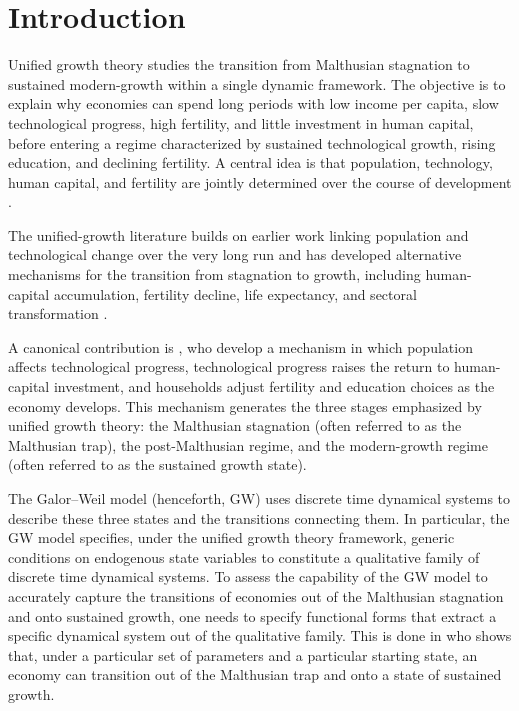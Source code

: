 \documentclass[a4paper,fleqn]{cas-sc}
\begin{document}
\maketitle

\section{Introduction}\label{sec:introduction}

Unified growth theory studies the transition from Malthusian stagnation to sustained modern-growth within a single dynamic framework. The objective is to explain why economies can spend long periods with low income per capita, slow technological progress, high fertility, and little investment in human capital, before entering a regime characterized by sustained technological growth, rising education, and declining fertility. A central idea is that population, technology, human capital, and fertility are jointly determined over the course of development \citep{Galor2000,Galor2005,Galor2011}.

The unified-growth literature builds on earlier work linking population and technological change over the very long run \citep{Kremer1993} and has developed alternative mechanisms for the transition from stagnation to growth, including human-capital accumulation, fertility decline, life expectancy, and sectoral transformation \citep{GalorMoav2002,HansenPrescott2002,Doepke2004,CervellatiSunde2005,StrulikWeisdorf2008}.

A canonical contribution is \citet{Galor2000}, who develop a mechanism in which population affects technological progress, technological progress raises the return to human-capital investment, and households adjust fertility and education choices as the economy develops. This mechanism generates the three stages emphasized by unified growth theory: the Malthusian stagnation (often referred to as the Malthusian trap), the post-Malthusian regime, and the modern-growth regime (often referred to as the sustained growth state). 

The Galor--Weil model (henceforth, GW) uses discrete time dynamical systems to describe these three states and the transitions connecting them. 
In particular, the GW model specifies, under the unified growth theory framework, generic conditions on endogenous state variables to constitute a qualitative family of discrete time dynamical systems.
To assess the capability of the GW model to accurately capture the transitions of economies out of the Malthusian stagnation and onto sustained growth, one needs to specify functional forms that extract a specific dynamical system out of the qualitative family.
This is done in \citet{Lagerlof2006} who shows that, under a particular set of parameters and a particular starting state, an economy can transition out of the Malthusian trap and onto a state of sustained growth.
\end{document}

